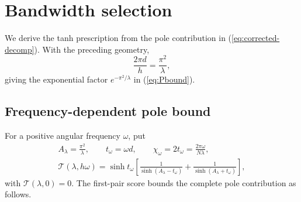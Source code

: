 \providecommand{\qeqref}[1]{(\ref{#1})}

\section{Bandwidth selection}
\label{sec:qi-bandwidth}

We derive the tanh prescription from the pole contribution in
\qeqref{eq:corrected-decomp}. With the preceding geometry,
\begin{equation}
 \frac{2\pi d}{h}=\frac{\pi^2}{\lambda},
 \label{eq:bandwidth-exponent}
\end{equation}
giving the exponential factor $e^{-\pi^2/\lambda}$ in \qeqref{eq:Pbound}.

\subsection{Frequency-dependent pole bound}
For a positive angular frequency $\omega$, put
\begin{equation}
 \begin{gathered}
 A_\lambda=\frac{\pi^2}{\lambda},\qquad
 t_\omega=\omega d,\qquad
 \chi_\omega=2t_\omega=\frac{2\pi\omega}{N\lambda},\\
 \mathcal T(\lambda,h\omega)=\sinh t_\omega
 \left[\frac1{\sinh(A_\lambda-t_\omega)}
       +\frac1{\sinh(A_\lambda+t_\omega)}\right],
 \end{gathered}
 \label{eq:bandwidth-pair}
\end{equation}
with $\mathcal T(\lambda,0)=0$. The first-pair score bounds the complete
pole contribution as follows.

